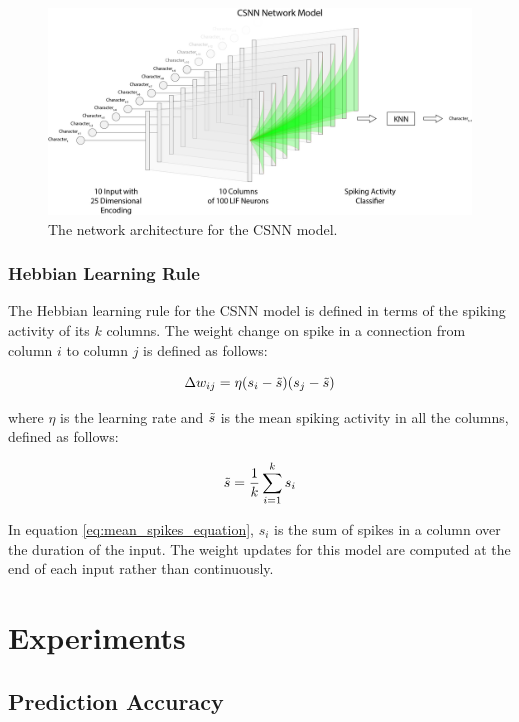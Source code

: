 \documentclass{article}
\begin{document}
\begin{figure}[H]
    \centering
    \includegraphics[width=0.9\linewidth]{../diagrams/csnn.png}
    \caption{The network architecture for the CSNN model.}
    \label{fig:csnn-network-diagram}
\end{figure}

\subsubsection*{Hebbian Learning Rule}
The Hebbian learning rule for the CSNN model is defined in terms of the spiking activity of its $k$ columns. The weight change on spike in a connection from column $i$ to column $j$ is defined as follows:

\begin{equation}
    \Delta w_{ij} = \eta(s_{i} - \Tilde{s})(s_{j} -  \Tilde{s})
\end{equation}

where $\eta$ is the learning rate and $\Tilde{s}$ is the mean spiking activity in all the columns, defined as follows:

\begin{equation}
    \Tilde{s} = \frac{1}{k} \sum_{i = 1}^{k}{s_i}
    \label{eq:mean_spikes_equation}
\end{equation}

In equation \ref{eq:mean_spikes_equation}, $s_i$ is the sum of spikes in a column over the duration of the input. The weight updates for this model are computed at the end of each input rather than continuously.

\section*{Experiments}

\subsection*{Prediction Accuracy}
\end{document}
